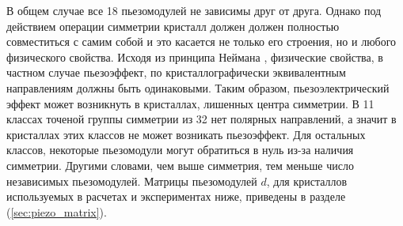 В общем случае все 18 пьезомодулей не зависимы друг от друга. Однако
под действием операции симметрии кристалл должен должен полностью совместиться с
самим собой и это касается не только его строения, но и любого физического свойства.
Исходя из принципа Неймана \cite{Shaskolska_1984}, физические свойства, в частном случае
пьезоэффект, по кристаллографически эквивалентным направлениям должны быть одинаковыми.
Таким образом, пьезоэлектрический эффект может возникнуть в кристаллах, лишенных центра
симметрии. В 11 классах точеной группы симметрии из 32 нет полярных направлений,
а значит в кристаллах этих классов не может возникать пьезоэффект. Для остальных
классов, некоторые пьезомодули могут обратиться в нуль из-за наличия симметрии.
Другими словами, чем выше симметрия, тем меньше число независимых пьезомодулей.
Матрицы пьезомодулей $d$, для кристаллов используемых в расчетах и экспериментах ниже,
  приведены в разделе (\ref{sec:piezo_matrix}).

